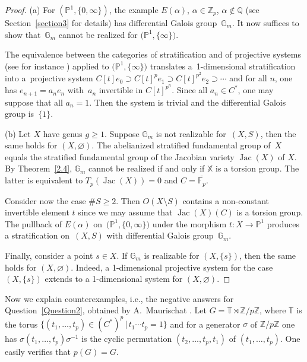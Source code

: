 \documentclass[pdftex]{sigma}
\numberwithin{equation}{section}
\begin{document}
\begin{proof} (a) For $(\mathbb{P}^1,\{0,\infty \})$, the example $E(\alpha)$, $\alpha \in \mathbb{Z}_p$, $\alpha \not \in \mathbb{Q}$ (see Section~\ref{section3} for details) has differential Galois group~$\mathbb{G}_m$. It now suffices to show that~$\mathbb{G}_m$ cannot be realized for $\big(\mathbb{P}^1,\{\infty \}\big)$.

The equivalence between the categories of stratification and of projective systems (see for instance \cite[Theorem~8]{Sa}) applied to $\big(\mathbb{P}^1,\{\infty \}\big)$ translates a~1-dimensional stratification into a~projective system $C[t]e_0\supset C[t]^pe_1\supset C[t]^{p^2}e_2\supset \cdots$ and for all $n$, one has $e_{n+1}=a_n e_n$ with~$a_n$ invertible in $C[t]^{p^n}$. Since all $a_n\in C^*$, one may suppose that all $a_n=1$. Then the system is trivial and the differential Galois group is~$\{1\}$.

(b) Let $X$ have genus $g\geq 1$. Suppose $\mathbb{G}_m$ is not realizable for~$(X,S)$, then the same holds for $(X,\varnothing)$. The abelianized stratified fundamental group of~$X$ equals the stratified fundamental group of the Jacobian variety $\operatorname{Jac}(X)$ of $X$. By Theorem~\ref{2.4}, $\mathbb{G}_m$ cannot be realized if and only if $\mathbb{X}$ is a torsion group. The latter is equivalent to $T_p(\operatorname{Jac}(X))=0$ and $C=\overline{\mathbb{F}_p}$.

Consider now the case $\#S\geq 2$. Then $O(X\setminus S)$ contains a non-constant invertible element $t$ since we may assume that $\operatorname{Jac}(X)(C)$ is a torsion group. The pullback of $E(\alpha )$ on~$\big(\mathbb{P}^1,\{0,\infty \}\big)$ under the morphism $t\colon X\rightarrow \mathbb{P}^1$ produces a stratification on~$(X,S)$ with differential Galois group~$\mathbb{G}_m$.

Finally, consider a point $s\in X$. If $\mathbb{G}_m$ is realizable for $(X,\{s\})$, then the same holds for $(X,\varnothing)$. Indeed, a 1-dimensional projective system for the case $(X,\{s\})$ extends to a 1-dimen\-sional system for $(X,\varnothing)$. \end{proof}

Now we explain counterexamples, i.e., the negative answers for Question~\ref{Question2}, obtained by A.~Maurischat \cite[Theorem~9.1]{R}.
Let $G=\mathbb{T}\rtimes \mathbb{Z}/p\mathbb{Z}$, where $\mathbb{T}$ is the torus $\{(t_1,\dots,t_p)\in (C^*)^p\, | \, t_1\cdots t_p=1\}$ and for a generator $\sigma$ of $\mathbb{Z}/p\mathbb{Z}$ one has $\sigma (t_1,\dots ,t_p)\sigma^{-1}$ is the cyclic permutation $(t_2,\dots ,t_p,t_1)$ of $(t_1,\dots ,t_p)$. One easily verifies that $p(G)=G$.
\end{document}

